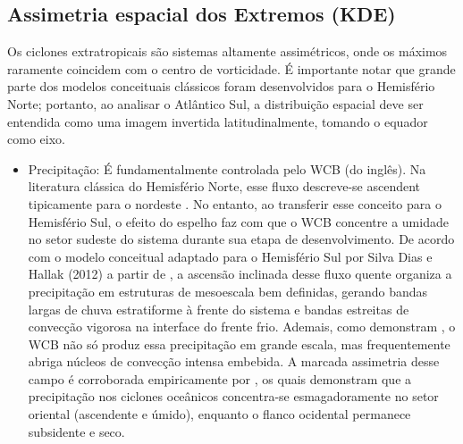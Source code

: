 \subsection{Assimetria espacial dos Extremos (KDE)}\label{subsec:tb_kde_asimetria}

Os ciclones extratropicais são sistemas altamente assimétricos, onde os máximos raramente coincidem com o centro de vorticidade. É importante notar que grande parte dos modelos conceituais clássicos foram desenvolvidos para o Hemisfério Norte; portanto, ao analisar o Atlântico Sul, a distribuição espacial deve ser entendida como uma imagem invertida latitudinalmente, tomando o equador como eixo.

\begin{itemize}
    \item Precipitação: É fundamentalmente controlada pelo WCB (do inglês). Na literatura clássica do Hemisfério Norte, esse fluxo descreve-se ascendent tipicamente para o nordeste \citep{blanchard2021warm}. No entanto, ao transferir esse conceito para o Hemisfério Sul, o efeito do espelho faz com que o WCB concentre a umidade no setor sudeste do sistema durante sua etapa de desenvolvimento. De acordo com o modelo conceitual adaptado para o Hemisfério Sul por Silva Dias e Hallak (2012) a partir de \citet{browning1986conceptual}, a ascensão inclinada desse fluxo quente organiza a precipitação em estruturas de mesoescala bem definidas, gerando bandas largas de chuva estratiforme à frente do sistema e bandas estreitas de convecção vigorosa na interface do frente frio. Ademais, como demonstram \citet{oertel2021warm}, o WCB não só produz essa precipitação em grande escala, mas frequentemente abriga núcleos de convecção intensa embebida. A marcada assimetria desse campo é corroborada empiricamente por \citet{naud2020evaluation}, os quais demonstram que a precipitação nos ciclones oceânicos concentra-se esmagadoramente no setor oriental (ascendente e úmido), enquanto o flanco ocidental permanece subsidente e seco.


\end{itemize}
